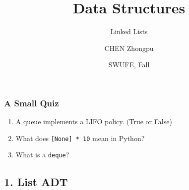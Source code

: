 \documentclass[aspectratio=169, 14pt]{beamer}
\title[Data Structures] %
{Data Structures}
\subtitle{Linked Lists}
\author[CHEN Zhongpu] %
{CHEN Zhongpu}
\institute[] %
{
	School of Computing and Artificial Intelligence \\
	\href{mailto:zpchen@swufe.edu.cn}{zpchen@swufe.edu.cn}
}
\date[] %
{SWUFE, Fall \the\year{}}
\begin{document}
\frame{\titlepage}

\begin{frame}
	\frametitle{A Small Quiz}
	\begin{enumerate}
		\item A queue implements a LIFO policy. (True or False)
		\item What does \texttt{[None] * 10} mean in Python?
		\item What is a \texttt{deque}?
	\end{enumerate}
\end{frame}

{
\begin{frame}
	\section{\textcolor{darkmidnightblue}{1. List ADT}}
\end{frame}

}
\end{document}
